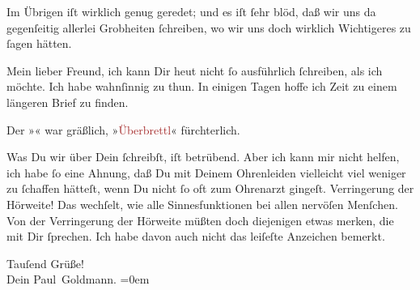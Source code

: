 \pstart
           Im Übrigen iſt wirklich genug geredet; und es iſt ſehr blöd, daß wir uns da
               gegenſeitig allerlei Grobheiten ſchreiben, wo wir uns doch {\pb}wirklich Wichtigeres zu ſagen hätten.\pend
           
\pstart
           Mein lieber Freund, ich kann Dir heut nicht ſo
               ausführlich ſchreiben, als ich möchte. Ich habe wahnſinnig zu thun. In einigen Tagen
               hoffe ich Zeit zu einem längeren Brief zu finden.\pend
           
\pstart
           Der »\label{K_L03092-34v}\label{K_L03092-34h}« war gräßlich, \label{K_L03092-22v}\label{K_L03092-22h} »\textcolor{brown}{Überbrettl}{}\ledrightnote{\textcolor{brown}{Überbrettl}}« fürchterlich.\pend
           
\pstart
           Was Du wir über Dein \label{K_L03092-21v}\label{K_L03092-21h}
               ſchreibſt, iſt betrübend. Aber ich {\pb}kann mir nicht
               helfen, ich habe ſo eine Ahnung, daß  Du mit Deinem Ohrenleiden vielleicht viel weniger zu ſchaffen hätteſt, wenn Du
               nicht ſo oft zum Ohrenarzt gingeſt. Verringerung der Hörweite!  Das wechſelt, wie alle Sinnesfunktionen bei allen
               nervöſen Menſchen. Von der Verringerung der Hörweite müßten doch diejenigen etwas
               merken, die mit Dir ſprechen. Ich habe davon auch nicht das leiſeſte Anzeichen
               bemerkt.\pend
           
\pstart
           Tauſend Grüße! {\\[\baselineskip]}Dein \spacefill\mbox{Paul Goldmann.}\pend
           \leftskip=0em{}\endnumbering{}
\begin{anhang}
\end{anhang}
      